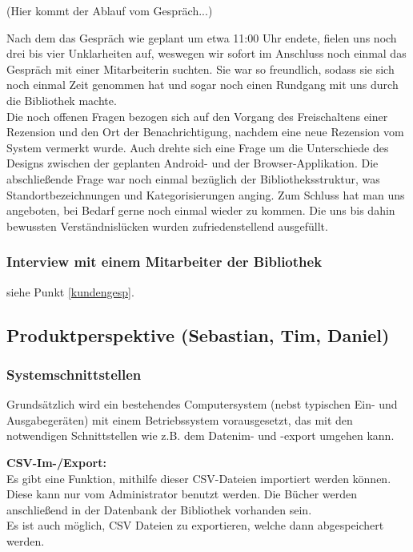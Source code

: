 \documentclass[fontsize=12pt,paper=a4,twoside]{scrartcl}
\begin{document}
(Hier kommt der Ablauf vom Gespräch...)

Nach dem das Gespräch wie geplant um etwa 11:00 Uhr endete, fielen uns noch 
drei bis vier Unklarheiten auf, weswegen wir sofort im Anschluss noch einmal das Gespräch mit einer Mitarbeiterin suchten. Sie war so freundlich, sodass sie sich noch einmal Zeit genommen hat und sogar noch einen Rundgang mit uns durch die Bibliothek machte. \\
Die noch offenen Fragen bezogen sich auf den Vorgang des Freischaltens einer Rezension
und den Ort der Benachrichtigung, nachdem eine neue Rezension vom System vermerkt
wurde. Auch drehte sich eine Frage um die Unterschiede des Designs zwischen
der geplanten Android- und der Browser-Applikation. Die abschließende Frage war noch einmal bezüglich der Bibliotheksstruktur, was Standortbezeichnungen und
Kategorisierungen anging. Zum Schluss hat man uns angeboten, bei Bedarf gerne 
noch einmal wieder zu kommen. Die uns bis dahin bewussten Verständnislücken
wurden zufriedenstellend ausgefüllt. 

\subsubsection{Interview mit einem Mitarbeiter der Bibliothek}

siehe Punkt \ref{kundengesp}.

\subsection{Produktperspektive (Sebastian, Tim, Daniel)}
  
\subsubsection{Systemschnittstellen}


  Grundsätzlich wird ein bestehendes Computersystem (nebst typischen Ein- und Ausgabegeräten) 
  mit einem Betriebssystem vorausgesetzt, das mit den notwendigen Schnittstellen wie z.B. dem 
  Datenim- und -export umgehen kann.
  
  \textbf{CSV-Im-/Export:}\\
  Es gibt eine Funktion, mithilfe dieser CSV-Dateien importiert werden können. Diese kann nur vom 
  Administrator benutzt werden. Die Bücher werden anschließend in der Datenbank der Bibliothek 
  vorhanden sein. \\
  Es ist auch möglich, CSV Dateien zu exportieren, welche dann abgespeichert werden.
\end{document}
